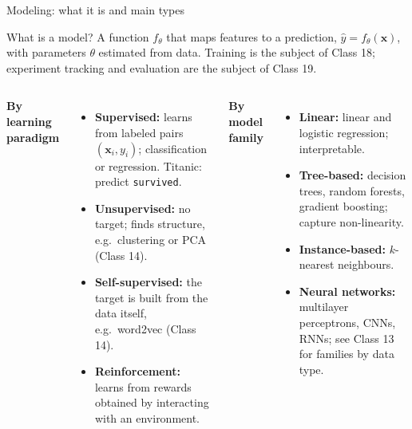 \begin{frame}{Modeling: what it is and main types}
\begin{block}{What is a model?}\small
A function $f_{\theta}$ that maps features to a prediction, $\hat{y} = f_{\theta}(\mathbf{x})$, with parameters $\theta$ estimated from data. Training is the subject of Class 18; experiment tracking and evaluation are the subject of Class 19.
\end{block}
\begin{columns}[T]
\textbf{By learning paradigm}
\begin{itemize}\footnotesize
\item \textbf{Supervised:} learns from labeled pairs $(\mathbf{x}_i, y_i)$; classification or regression. Titanic: predict \texttt{survived}.
\item \textbf{Unsupervised:} no target; finds structure, e.g.\ clustering or PCA (Class 14).
\item \textbf{Self-supervised:} the target is built from the data itself, e.g.\ word2vec (Class 14).
\item \textbf{Reinforcement:} learns from rewards obtained by interacting with an environment.
\end{itemize}
\textbf{By model family}
\begin{itemize}\footnotesize
\item \textbf{Linear:} linear and logistic regression; interpretable.
\item \textbf{Tree-based:} decision trees, random forests, gradient boosting; capture non-linearity.
\item \textbf{Instance-based:} $k$-nearest neighbours.
\item \textbf{Neural networks:} multilayer perceptrons, CNNs, RNNs; see Class 13 for families by data type.
\end{itemize}
\end{columns}
\coursefooter
\end{frame}
